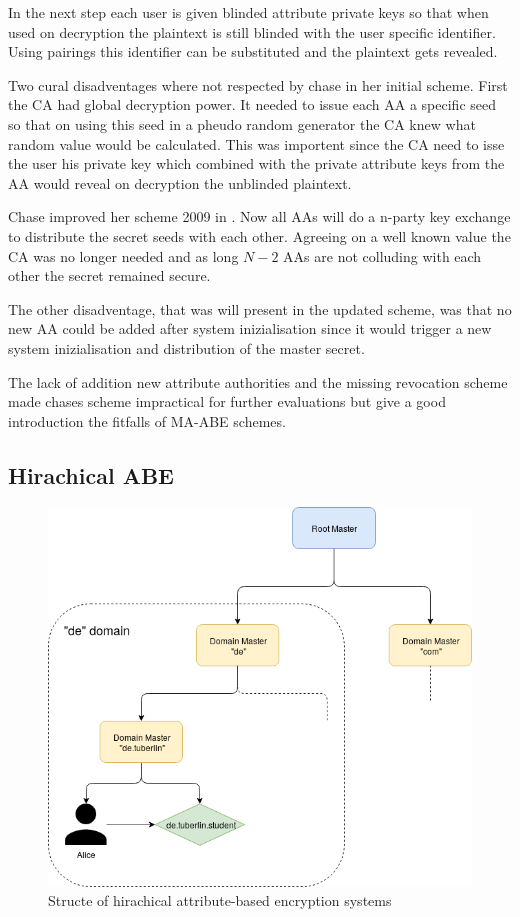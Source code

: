 In the next step each user is given blinded attribute private keys so that when used on decryption the plaintext is still blinded with the user specific identifier. Using pairings this identifier can be substituted and the plaintext gets revealed. 

Two cural disadventages where not respected by chase in her initial scheme. First the CA had global decryption power. It needed to issue each AA a specific seed so that on using this seed in a pheudo random generator the CA knew what random value would be calculated. This was importent since the CA need to isse the user his private key which combined with the private attribute keys from the AA would reveal on decryption the unblinded plaintext. 

Chase improved her scheme 2009 in \cite{chase2009improving}. Now all AAs will do a n-party key exchange to distribute the secret seeds with each other. Agreeing on a well known value the CA was no longer needed and as long $N-2$ AAs are not colluding with each other the secret remained secure. 

The other disadventage, that was will present in the updated scheme, was that no new AA could be added after system inizialisation since it would trigger a new system inizialisation and distribution of the master secret. 

The lack of addition new attribute authorities and the missing revocation scheme made chases scheme impractical for further evaluations but give a good introduction the fitfalls of MA-ABE schemes.

\subsection{Hirachical ABE}
\label{sec:HABE}

\begin{figure}[!ht]
\centering
    \includegraphics[width=0.5\linewidth]{img/HABE.png}
    \caption{Structe of hirachical attribute-based encryption systems}
    \label{fig:habe}
\end{figure}

